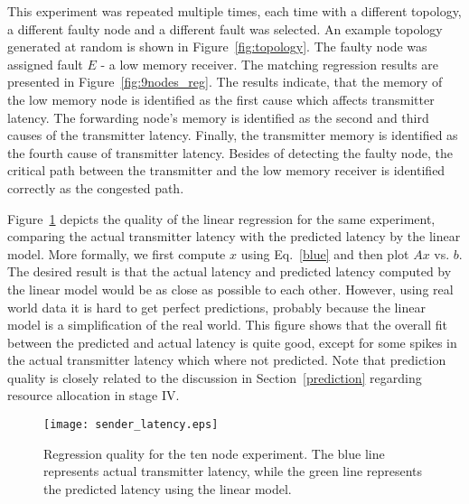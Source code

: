 \documentclass[times, 10pt,twocolumn]{article}
\begin{document}
This experiment was repeated multiple times, each time with a different topology, a different faulty node and a different fault was selected. An example topology generated at random is shown in Figure~\ref{fig:topology}. The faulty node was assigned fault $E$ - a low memory receiver. The matching regression results are presented in Figure~\ref{fig:9nodes_reg}. The results indicate, that the memory of the low memory node is identified as the first cause which affects transmitter latency. The forwarding node's memory is identified as the second and third causes of the transmitter latency. Finally, the transmitter memory is identified as the fourth cause of transmitter latency.
Besides of detecting the faulty node, the critical path between the transmitter and the low memory receiver
is identified correctly as the congested path.

Figure~\ref{fig:sender_latency} depicts the quality of the linear regression for the same experiment, comparing the actual transmitter latency with the predicted latency by the linear model. More formally, we first compute $x$ using Eq.~\ref{blue} and then plot $Ax$ vs. $b$. The desired result is that the actual latency and predicted latency
computed by the linear model would be as close as possible to each other. However, using real world data it is hard
to get perfect predictions, probably because the linear model is a simplification of the real world.
This figure shows that the overall fit between the predicted and actual latency is quite good, except for some spikes
in the actual transmitter latency which where not predicted. Note that prediction quality is closely related to the discussion in Section~\ref{prediction} regarding resource allocation in stage IV. 





\begin{figure}[ht!]
\hspace{-0.8cm}
\texttt{[image: sender\_latency.eps]}\\
  \caption{Regression quality for the ten node experiment. The blue line represents actual transmitter latency, while the green line represents the predicted latency using the linear model.}\label{fig:sender_latency}
\end{figure}
\end{document}
